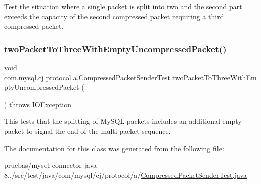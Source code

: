 Test the situation where a single packet is split into two and the second part exceeds the capacity of the second compressed packet requiring a third compressed packet. \mbox{\label{classcom_1_1mysql_1_1cj_1_1protocol_1_1a_1_1_compressed_packet_sender_test_ac8e6517377ed11a4566c755ffc1b65de}} 
\subsubsection{\texorpdfstring{two\+Packet\+To\+Three\+With\+Empty\+Uncompressed\+Packet()}{twoPacketToThreeWithEmptyUncompressedPacket()}}
{\footnotesize\ttfamily void com.\+mysql.\+cj.\+protocol.\+a.\+Compressed\+Packet\+Sender\+Test.\+two\+Packet\+To\+Three\+With\+Empty\+Uncompressed\+Packet (\begin{DoxyParamCaption}{ }\end{DoxyParamCaption}) throws I\+O\+Exception}

This tests that the splitting of My\+S\+QL packets includes an additional empty packet to signal the end of the multi-\/packet sequence. 

The documentation for this class was generated from the following file\+:\begin{DoxyCompactItemize}
\item 
pruebas/mysql-\/connector-\/java-\/8../src/test/java/com/mysql/cj/protocol/a/\mbox{\hyperlink{_compressed_packet_sender_test_8java}{Compressed\+Packet\+Sender\+Test.\+java}}\end{DoxyCompactItemize}
